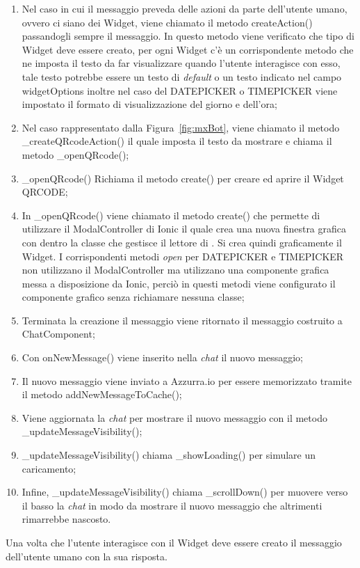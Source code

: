 \begin{enumerate}
	\item Nel caso in cui il messaggio preveda delle azioni da parte dell'utente umano, ovvero ci siano dei Widget, viene chiamato il metodo createAction() passandogli sempre il messaggio. In questo metodo viene verificato che tipo di Widget deve essere creato, per ogni Widget c'è un corrispondente metodo che ne imposta il testo da far visualizzare quando l'utente interagisce con esso, tale testo potrebbe essere un testo di \emph{default} o un testo indicato nel campo widgetOptions inoltre nel caso del DATEPICKER o TIMEPICKER viene impostato il formato di visualizzazione del giorno e dell'ora;
	\item Nel caso rappresentato dalla Figura~\ref{fig:mxBot}, viene chiamato il metodo \_createQRcodeAction()
	 il quale imposta il testo da mostrare e chiama il metodo \_openQRcode();
	\item \_openQRcode() Richiama il metodo create() per creare ed aprire il Widget QRCODE;
	\item In \_openQRcode() viene chiamato il metodo create() che permette di utilizzare il ModalController di Ionic il quale crea una nuova finestra grafica con dentro la classe che gestisce il lettore di . Si crea quindi graficamente il Widget. I corrispondenti metodi \emph{open} per DATEPICKER e TIMEPICKER non utilizzano il ModalController ma utilizzano una componente grafica messa a disposizione da Ionic, perciò in questi metodi viene configurato il componente grafico senza richiamare nessuna classe;
	\item Terminata la creazione il messaggio viene ritornato il messaggio costruito a ChatComponent;
	\item Con onNewMessage() viene inserito nella \emph{chat} il nuovo messaggio;
	\item Il nuovo messaggio viene inviato a Azzurra.io per essere memorizzato tramite il metodo addNewMessageToCache();
	\item Viene aggiornata la \emph{chat} per mostrare il nuovo messaggio con il metodo \_updateMessageVisibility();
	\item \_updateMessageVisibility() chiama \_showLoading() per simulare un caricamento;
	\item Infine, \_updateMessageVisibility() chiama \_scrollDown() per muovere verso il basso la \emph{chat} in modo da mostrare il nuovo messaggio che altrimenti rimarrebbe nascosto.
\end{enumerate}

Una volta che l'utente interagisce con il Widget deve essere creato il messaggio dell'utente umano con la sua risposta. 
\clearpage
